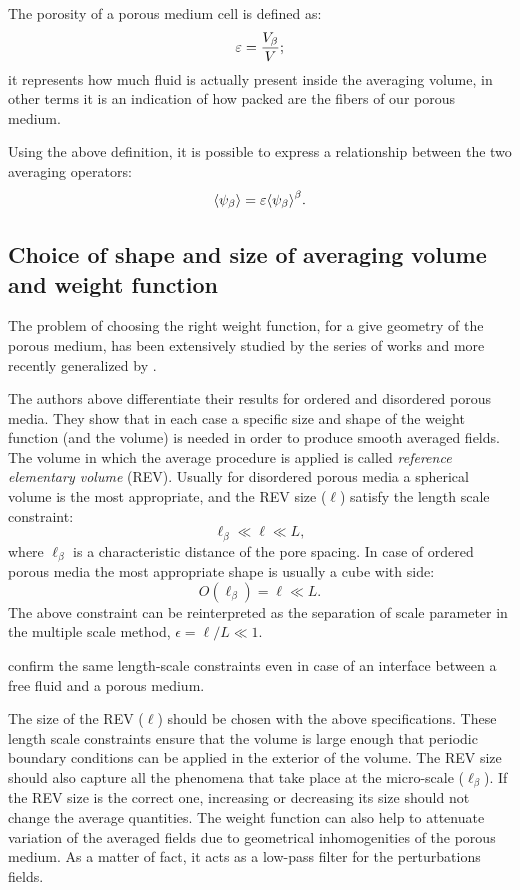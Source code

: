 The porosity of a porous medium cell is defined as:
\begin{equation}
	\varepsilon = \dfrac{V_\beta}{V};
	\label{eq:porosity}
\end{equation}
it represents how much fluid is actually present inside the averaging volume, in other terms it is an indication of how packed are the fibers of our porous medium.

Using the above definition, it is possible to express a relationship between the two averaging operators:
\begin{equation}
	{\left< \psi_{\beta} \right>} =  \varepsilon {\left< \psi_{\beta} \right>}^{\beta}.
	\label{eq:means_vs_meani}
\end{equation}

\subsection{Choice of shape and size of averaging volume and weight function}
\label{ch:filter}

The problem of choosing the right weight function, for a give geometry of the porous medium, has been extensively studied by the series of works \citet{quintard1994transport1} \cite{quintard1994transport2} \cite{quintard1994transport3} \cite{quintard1994transport4} \cite{quintard1994transport5} and more recently generalized by \citet{davit2017technical}.

The authors above differentiate their results for ordered and disordered porous media. They show that in each case a specific size and shape of the weight function (and the volume) is needed in order to produce smooth averaged fields.
The volume in which the average procedure is applied is called \textit{reference elementary volume} (REV).
Usually for disordered porous media a spherical volume is the most appropriate, and the REV size ($\ell$) satisfy the length scale constraint:
$$
\ell_{\beta} \ll \ell \ll L,
$$
where $\ell_{\beta}$ is a characteristic distance of the pore spacing. 
In case of ordered porous media the most appropriate shape is usually a cube with side:
$$
O(\ell_{\beta}) = \ell \ll L.
$$
The above constraint can be reinterpreted as the separation of scale parameter in the multiple scale method, $\epsilon = \ell/L \ll 1$.

\citet{ochoa1995momentum} confirm the same length-scale constraints even in case of an interface between a free fluid and a porous medium.

The size of the REV ($\ell$) should be chosen with the above specifications. These length scale constraints ensure that the volume is large enough that periodic boundary conditions can be applied in the exterior of the volume. The REV size should also capture all the phenomena that take place at the micro-scale ($\ell_{\beta}$).
If the REV size is the correct one, increasing or decreasing its size should not change the average quantities. The weight function can also help to attenuate variation of the averaged fields due to geometrical inhomogenities of the porous medium. As a matter of fact, it acts as a low-pass filter for the perturbations fields.

